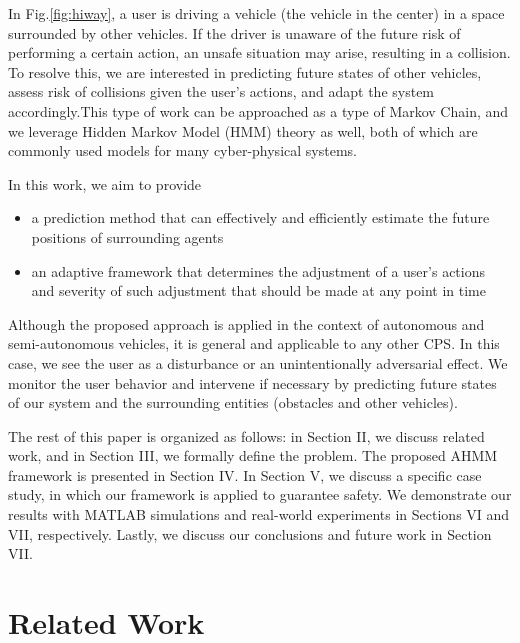 \documentclass[conference]{IEEEtran}
\begin{document}
    In Fig.\ref{fig:hiway}, a  user is driving a vehicle (the vehicle in the center) in a space surrounded by other vehicles. If the driver is unaware of the future risk of performing a certain action, an unsafe situation may arise, resulting in a collision. To resolve this, we are interested in predicting future states of other vehicles, assess risk of collisions given the user's actions, and adapt the system accordingly.This type of work can be approached as a type of Markov Chain, and we leverage Hidden Markov Model (HMM) theory as well, both of which are commonly used models for many cyber-physical systems.
    
     In this work, we aim to provide
    \begin{itemize}
    \item{a prediction method that can effectively and efficiently estimate the future positions of surrounding agents}
    \item{an adaptive framework that determines the adjustment of a user's actions and severity of such adjustment that should be made at any point in time}
    \end{itemize}
  
   Although the proposed approach is applied in the context of autonomous and semi-autonomous vehicles, it is general and applicable to any other CPS. In this case, we see the user as a disturbance or an unintentionally adversarial effect. We monitor the user behavior and intervene if necessary by predicting future states of our system and the surrounding entities (obstacles and other vehicles).    
    
    The rest of this paper is organized as follows: in Section II, we discuss related work, and in Section III, we formally define the problem. The proposed AHMM framework is presented in Section IV. In Section V, we discuss a specific case study, in which our framework is applied to guarantee safety. We demonstrate our results with MATLAB simulations and real-world experiments in Sections VI and VII, respectively. Lastly, we discuss our conclusions and future work in Section VII.

    

\section{Related Work}

    
\end{document}
